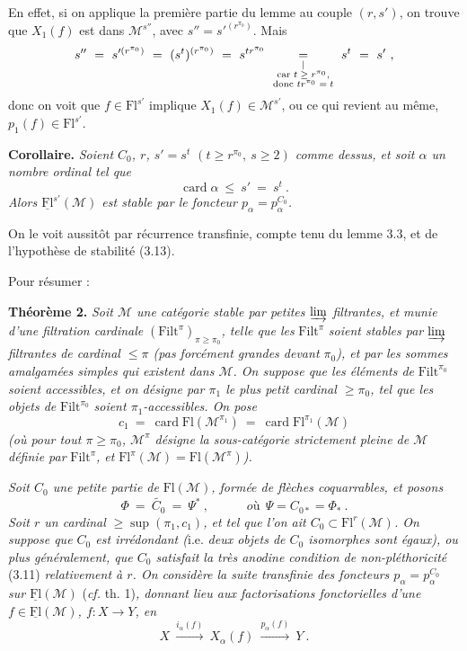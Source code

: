 \documentclass[11pt]{article}
\newcommand{\printedpage}[1]{\marginpar{\footnotesize p.~#1}}
\newcommand{\msp}[1]{\marginpar{\footnotesize [#1]}}
\newcommand{\M}{\mathcal{M}}
\newcommand{\Fl}{\mathrm{Fl}}
\newcommand{\uFl}{\underline{\mathrm{Fl}}}
\newcommand{\Filt}{\mathrm{Filt}}
\newcommand{\card}{\operatorname{card}}
\begin{document}
En effet, si on applique la première partie du lemme au couple $(r,s')$, on trouve que $X_1(f)$ est dans $\M^{s''}$, avec $s''=s'^{(r^{\pi_0})}$. Mais
\[
s''\ =\ s'^{(r^{\pi_0})}\ =\ (s^t)^{(r^{\pi_0})}\ =\ s^{tr^{\pi_0}}\ \underset{\substack{\vert\\ \text{\scriptsize car $t\geq r^{\pi_0}$,}\\ \text{\scriptsize donc $tr^{\pi_0}=t$}}}{=}\ s^t\ =\ s'\ ,
\]
\printedpage{18}
donc on voit que $f\in\Fl^{s'}$ implique $X_1(f)\in\M^{s'}$, ou ce qui revient au même, $p_1(f)\in\Fl^{s'}$.

\textbf{Corollaire.} \textit{Soient $C_0$, $r$, $s'=s^t$ $(t\geq r^{\pi_0},\ s\geq 2)$ comme dessus, et soit $\alpha$ un nombre ordinal tel que}
\[
\card\alpha\ \leq\ s'\ =\ s^t\ .
\]
\textit{Alors $\uFl^{s'}(\M)$ est stable par le foncteur $p_\alpha=p_\alpha^{C_0}$.}

On le voit aussitôt par récurrence transfinie, compte tenu du lemme 3.3, et de l'hypothèse de stabilité (3.13).

Pour résumer :

\textbf{Théorème 2.} \textit{Soit $\M$ une catégorie stable par petites $\varinjlim$ filtrantes, et munie d'une filtration cardinale} $(\Filt^\pi)_{\pi\geq\pi_0}$\textit{, telle que les} $\Filt^\pi$ \textit{soient stables par $\varinjlim$ filtrantes de cardinal $\leq\pi$ (pas forcément grandes devant $\pi_0$), et par les sommes amalgamées simples qui existent dans $\M$. On suppose que les éléments de} $\Filt^{\pi_0}$ \textit{soient accessibles, et on désigne par $\pi_1$ le plus petit cardinal $\geq\pi_0$, tel que les objets de} $\Filt^{\pi_0}$ \textit{soient $\pi_1$-accessibles. On pose} \msp{page 27}
\[
c_1\ =\ \card\Fl(\M^{\pi_1})\ =\ \card\Fl^{\pi_1}(\M)
\]
\textit{(où pour tout $\pi\geq\pi_0$, $\M^\pi$ désigne la sous-catégorie strictement pleine de $\M$ définie par} $\Filt^\pi$\textit{, et} $\Fl^\pi(\M)=\Fl(\M^\pi)$\textit{).}

\textit{Soit $C_0$ une petite partie de} $\Fl(\M)$\textit{, formée de flèches coquarrables, et posons}
\[
\Phi\ =\ \widetilde{C_0}\ =\ \Psi^*\ ,\qquad\quad\textit{où}\ \ \Psi=C_{0*}=\Phi_*\ .
\]
\textit{Soit $r$ un cardinal} $\geq\sup(\pi_1,c_1)$\textit{, et tel que l'on ait $C_0\subset\Fl^r(\M)$. On suppose que $C_0$ est irrédondant (}i.e.\textit{ deux objets de $C_0$ isomorphes sont égaux), ou plus généralement, que $C_0$ satisfait la très anodine condition de non-pléthoricité} \textup{(3.11)} \textit{relativement à $r$. On considère la suite transfinie des foncteurs $p_\alpha=p_\alpha^{C_0}$ sur $\uFl(\M)$} \textup{(}\textit{cf.} \textup{th. 1)}\textit{, donnant lieu aux factorisations fonctorielles d'une $f\in\uFl(\M)$, $f:X\longrightarrow Y$, en}
\[
X\ \xrightarrow{i_\alpha(f)}\ X_\alpha(f)\ \xrightarrow{p_\alpha(f)}\ Y\ . \tag*{(3.16)}
\]
\end{document}

